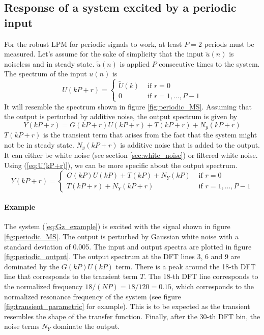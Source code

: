 \subsection{Response of a system excited by a periodic input}
For the robust LPM for periodic signals to work, at least $P=2$ periods must be measured. Let's assume for the sake of simplicity that the input $\tilde{u}(n)$ is noiseless and in steady state. $\tilde{u}(n)$ is applied $P$ consecutive times to the system.
The spectrum of the input $u(n)$ is
\begin{equation}
    U(kP+r) =  
    \begin{cases}
        \tilde{U}(k) &\text{ if } r = 0\\
        0 & \text{ if } r = 1,\ldots,P-1
    \end{cases}
    \label{eq:U(kP+r)}
\end{equation}
It will resemble the spectrum shown in figure \ref{fig:periodic_MS}. Assuming that the output is perturbed by additive noise, the output spectrum is given by
\begin{equation*}
    Y(kP+r) = G(kP+r)U(kP+r) + T(kP+r) + N_y(kP+r)
\end{equation*}
$T(kP+r)$ is the transient term that arises from the fact that the system might not be in steady state. $N_y(kP+r)$ is additive noise that is added to the output. It can either be white noise (see section \ref{sec:white_noise}) or filtered white noise. Using (\ref{eq:U(kP+r)}), we can be more specific about the output spectrum.
\begin{equation*}
\boxed{
    Y(kP+r) =
    \begin{cases}
     G(kP)U(kP) + T(kP) + N_Y(kP) &\text{ if } r = 0\\
     T(kP+r) + N_Y(kP+r) &\text{ if } r = 1,\ldots,P-1
     \end{cases}
     }
\end{equation*}

\paragraph{Example}
The system (\ref{eq:Gz_example}) is excited with the signal shown in figure \ref{fig:periodic_MS}. The output is perturbed by Gaussian white noise with a standard deviation of 0.005. The input and output spectra are plotted in figure \ref{fig:periodic_output}. The output spectrum at the DFT lines 3, 6 and 9 are dominated by the $G(kP)U(kP)$ term. There is a peak around the 18-th DFT line that corresponds to the transient term $T$. The 18-th DFT line corresponds to the normalized frequency $18/(NP) = 18/120 = 0.15$, which corresponds to the normalized resonance frequency of the system (see figure \ref{fig:transient_parametric} for example). This is to be expected as the transient resembles the shape of the transfer function. Finally, after the 30-th DFT bin, the noise terms $N_Y$ dominate the output.


